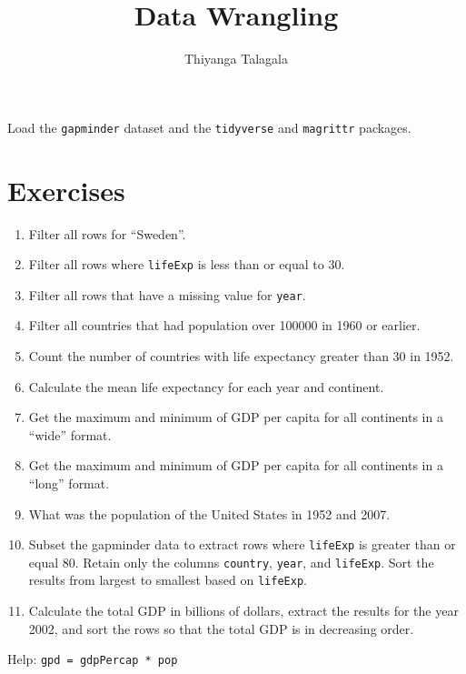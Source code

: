 \documentclass[]{article}
\title{Data Wrangling}
\author{Thiyanga Talagala}
\date{}
\begin{document}
\maketitle

Load the \texttt{gapminder} dataset and the \texttt{tidyverse} and
\texttt{magrittr} packages.

\hypertarget{exercises}{%
\section{Exercises}\label{exercises}}

\begin{enumerate}
\def\labelenumi{\arabic{enumi}.}
\item
  Filter all rows for ``Sweden''.
\item
  Filter all rows where \texttt{lifeExp} is less than or equal to 30.
\item
  Filter all rows that have a missing value for \texttt{year}.
\item
  Filter all countries that had population over 100000 in 1960 or
  earlier.
\item
  Count the number of countries with life expectancy greater than 30 in
  1952.
\item
  Calculate the mean life expectancy for each year and continent.
\item
  Get the maximum and minimum of GDP per capita for all continents in a
  ``wide'' format.
\item
  Get the maximum and minimum of GDP per capita for all continents in a
  ``long'' format.
\item
  What was the population of the United States in 1952 and 2007.
\item
  Subset the gapminder data to extract rows where \texttt{lifeExp} is
  greater than or equal 80. Retain only the columns \texttt{country},
  \texttt{year}, and \texttt{lifeExp}. Sort the results from largest to
  smallest based on \texttt{lifeExp}.
\item
  Calculate the total GDP in billions of dollars, extract the results
  for the year 2002, and sort the rows so that the total GDP is in
  decreasing order.
\end{enumerate}

Help: \texttt{gpd\ =\ gdpPercap\ *\ pop}
\end{document}
